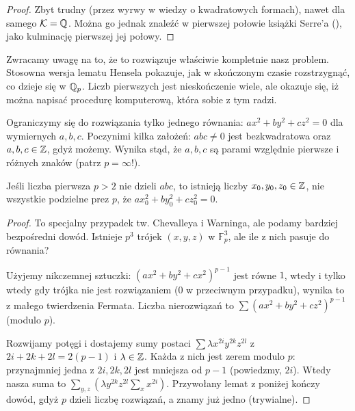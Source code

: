\begin{proof}
	Zbyt trudny (przez wyrwy w wiedzy o kwadratowych formach), nawet dla samego $\mathcal K = \mathbb Q$.
	Można go jednak znaleźć w pierwszej połowie książki Serre'a (\cite{serre73}), jako kulminację pierwszej jej połowy.
\end{proof}

Zwracamy uwagę na to, że to rozwiązuje właściwie kompletnie nasz problem.
Stosowna wersja lematu Hensela pokazuje, jak w skończonym czasie rozstrzygnąć, co dzieje się w $\mathbb Q_p$.
Liczb pierwszych jest nieskończenie wiele, ale okazuje się, iż można napisać procedurę komputerową, która sobie z tym radzi.

\begin{historia}\end{historia}

\begin{historia}\end{historia}

Ograniczymy się do rozwiązania tylko jednego równania: $ax^2 + by^2 + cz^2 = 0$ dla wymiernych $a, b,c $.
Poczynimi kilka założeń: $abc \neq 0$ jest bezkwadratowa oraz $a,b,c \in \mathbb Z$, gdyż możemy.
Wynika stąd, że $a,b,c$ są parami względnie pierwsze i różnych znaków (patrz $p= \infty$!).

\begin{fakt}
	Jeśli liczba pierwsza $p > 2$ nie dzieli $abc$, to istnieją liczby $x_0, y_0, z_0 \in \mathbb Z$, nie wszystkie podzielne prez $p$, że $ax_0^2 + by_0^2 + cz_0^2 = 0$.
\end{fakt}

\begin{proof} %
	To specjalny przypadek tw. Chevalleya i Warninga, ale podamy bardziej bezpośredni dowód.
	Istnieje $p^3$ trójek $(x,y,z)$ w $\mathbb F_p^3$, ale ile z nich pasuje do równania?

	Użyjemy nikczemnej sztuczki: $(ax^2+by^2+cx^2)^{p-1}$ jest równe $1$, wtedy i tylko wtedy gdy trójka nie jest rozwiązaniem ($0$ w przeciwnym przypadku), wynika to z małego twierdzenia Fermata.
	Liczba nierozwiązań to $\sum (ax^2+by^2+cz^2)^{p-1}$ (modulo $p$).

	Rozwijamy potęgi i dostajemy sumy postaci $\sum \lambda x^{2i}y^{2k}z^{2l}$ z $2i+2k+2l = 2(p-1)$ i $\lambda \in \mathbb Z$.
	Każda z nich jest zerem modulo $p$: 
	przynajmniej jedna z $2i, 2k, 2l$ jest mniejsza od $p-1$ (powiedzmy, $2i$).
	Wtedy nasza suma to $\sum_{y,z} (\lambda y^{2k} z^{2l} \sum_x x^{2i})$.
	Przywołany lemat z poniżej kończy dowód, gdyż $p$ dzieli liczbę rozwiązań, a znamy już jedno (trywialne).
\end{proof}

